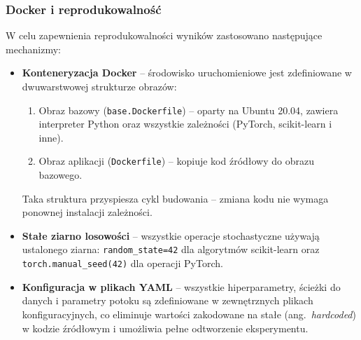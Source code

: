 \subsubsection{Docker i reprodukowalność}
\label{subsubsec:docker}

W celu zapewnienia reprodukowalności wyników zastosowano następujące mechanizmy:

\begin{itemize}
    \item \textbf{Konteneryzacja Docker} -- środowisko uruchomieniowe jest zdefiniowane w dwuwarstwowej strukturze obrazów:
    \begin{enumerate}
        \item Obraz bazowy (\texttt{base.Dockerfile}) -- oparty na Ubuntu 20.04, zawiera interpreter Python oraz wszystkie zależności (PyTorch, scikit-learn i inne).
        \item Obraz aplikacji (\texttt{Dockerfile}) -- kopiuje kod źródłowy do obrazu bazowego.
    \end{enumerate}
    Taka struktura przyspiesza cykl budowania -- zmiana kodu nie wymaga ponownej instalacji zależności.

    \item \textbf{Stałe ziarno losowości} -- wszystkie operacje stochastyczne używają ustalonego ziarna: \texttt{random\_state=42} dla algorytmów scikit-learn oraz \texttt{torch.manual\_seed(42)} dla operacji PyTorch.

    \item \textbf{Konfiguracja w plikach YAML} -- wszystkie hiperparametry, ścieżki do danych i parametry potoku są zdefiniowane w zewnętrznych plikach konfiguracyjnych, co eliminuje wartości zakodowane na stałe (ang.~\emph{hardcoded}) w kodzie źródłowym i umożliwia pełne odtworzenie eksperymentu.
\end{itemize}
